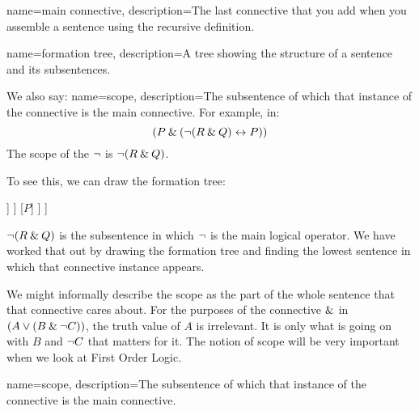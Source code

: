 {
	name=main connective,
	description={The last connective that you add when you assemble a sentence using the recursive definition.}
}

{
	name=formation tree,
	description={A tree showing the structure of a sentence and its subsentences.}
}



We also say:
{
name=scope,
description={The subsentence of which that instance of the connective is the main connective.}
}
For example, in:
$$(P \mathbin{\&} (\neg (R \mathbin{\&} Q) \leftrightarrow P))$$
The scope of the $\neg$  is $\neg (R\mathbin{\&} Q)$.

To see this, we can draw the formation tree:

\begin{center}
	\begin{forest}
[$(P \,\mainconnective{\eand}\,  (\enot (R \eand Q) \eiff P))$
	[$P$]
	[$(\enot (R \eand Q) \,\mainconnective{\eiff}\,  P))$
		[$\mainconnective{\enot}\,   (R \eand Q)$
			[$(R\,\mainconnective{\eand}\,   Q)$
				[$R$]
				[$Q$]
			]
		]
		[$P$]
	]
]
\end{forest}
\end{center}
$\neg (R\mathbin{\&} Q)$ is the subsentence in which $\neg$ is the main logical operator. We have worked that out by drawing the formation tree and finding the lowest sentence in which that connective instance appears.

We might informally describe the scope as the part of the whole sentence that that connective cares about. For the purposes of the connective $\mathbin{\&}$ in $(A\vee (B\mathbin{\&} \neg C))$, the truth value of $A$ is irrelevant. It is only what is going on with $B$ and $\neg C$ that matters for it. The notion of scope will be very important when we look at First Order Logic.


{
name=scope,
description={The subsentence of which that instance of the connective is the main connective.}
}

